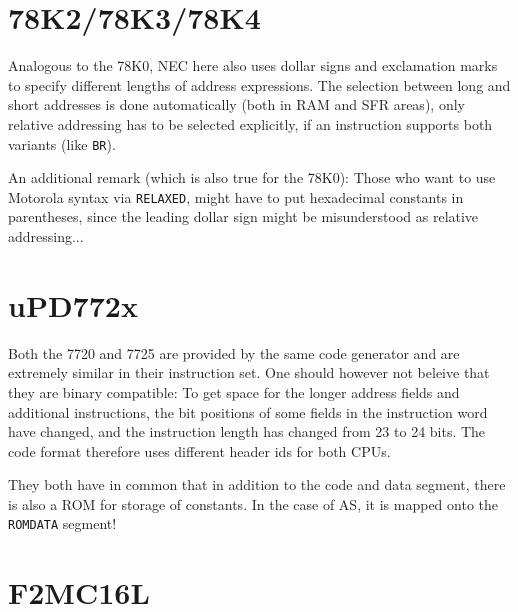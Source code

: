 \documentclass[12pt,twoside]{report}
\newcommand{\tty}[1]{{\tt #1}}
\newcommand{\asname}{{AS}}
\begin{document}
\section{78K2/78K3/78K4}
\label{78K234Spec}

Analogous to the 78K0, NEC here also uses dollar signs and exclamation
marks to specify different lengths of address expressions.  The selection
between long and short addresses is done automatically (both in RAM and
SFR areas), only relative addressing has to be selected explicitly, if an
instruction supports both variants (like {\tt BR}).

An additional remark (which is also true for the 78K0): Those who want to
use Motorola syntax via {\tt RELAXED}, might have to put hexadecimal
constants in parentheses, since the leading dollar sign might be
misunderstood as relative addressing...


\section{uPD772x}

Both the 7720 and 7725 are provided by the same code generator and are
extremely similar in their instruction set.  One should however not
beleive that they are binary compatible: To get space for the longer
address fields and additional instructions, the bit positions of some
fields in the instruction word have changed, and the instruction length
has changed from 23 to 24 bits.  The code format therefore uses different
header ids for both CPUs.

They both have in common that in addition to the code and data segment,
there is also a ROM for storage of constants.  In the case of \asname{}, it is
mapped onto the \tty{ROMDATA} segment!


\section{F2MC16L}
\end{document}
